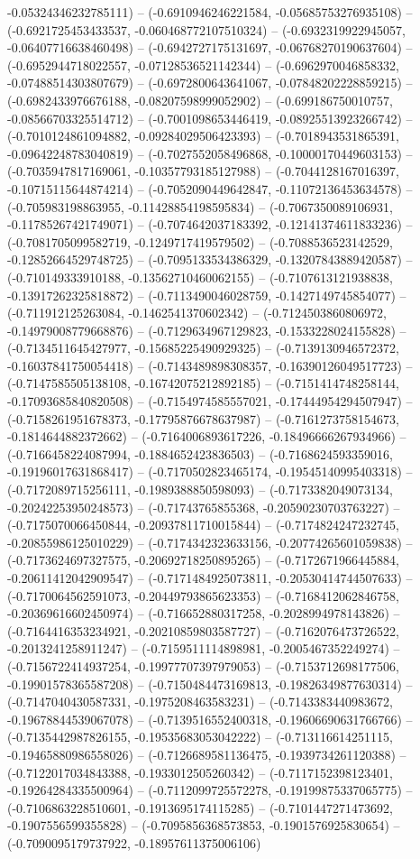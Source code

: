 -0.05324346232785111) -- (-0.6910946246221584, -0.05685753276935108) -- (-0.6921725453433537, -0.060468772107510324) -- (-0.6932319922945057, -0.06407716638460498) -- (-0.6942727175131697, -0.06768270190637604) -- (-0.6952944718022557, -0.07128536521142344) -- (-0.6962970046858332, -0.07488514303807679) -- (-0.6972800643641067, -0.07848202228859215) -- (-0.6982433976676188, -0.08207598999052902) -- (-0.699186750010757, -0.08566703325514712) -- (-0.7001098653446419, -0.08925513923266742) -- (-0.7010124861094882, -0.09284029506423393) -- (-0.7018943531865391, -0.09642248783040819) -- (-0.7027552058496868, -0.10000170449603153) -- (-0.7035947817169061, -0.10357793185127988) -- (-0.7044128167016397, -0.10715115644874214) -- (-0.7052090449642847, -0.11072136453634578) -- (-0.705983198863955, -0.11428854198595834) -- (-0.7067350089106931, -0.11785267421749071) -- (-0.7074642037183392, -0.12141374611833236) -- (-0.7081705099582719, -0.1249717419579502) -- (-0.7088536523142529, -0.12852664529748725) -- (-0.7095133534386329, -0.13207843889420587) -- (-0.710149333910188, -0.13562710460062155) -- (-0.7107613121938838, -0.13917262325818872) -- (-0.7113490046028759, -0.1427149745854077) -- (-0.711912125263084, -0.1462541370602342) -- (-0.7124503860806972, -0.14979008779668876) -- (-0.7129634967129823, -0.1533228024155828) -- (-0.7134511645427977, -0.15685225490929325) -- (-0.7139130946572372, -0.16037841750054418) -- (-0.7143489898308357, -0.16390126049517723) -- (-0.7147585505138108, -0.16742075212892185) -- (-0.7151414748258144, -0.17093685840820508) -- (-0.7154974585557021, -0.17444954294507947) -- (-0.7158261951678373, -0.17795876678637987) -- (-0.7161273758154673, -0.1814644882372662) -- (-0.7164006893617226, -0.18496666267934966) -- (-0.7166458224087994, -0.1884652423836503) -- (-0.7168624593359016, -0.19196017631868417) -- (-0.7170502823465174, -0.19545140995403318) -- (-0.7172089715256111, -0.1989388850598093) -- (-0.7173382049073134, -0.20242253950248573) -- (-0.71743765855368, -0.20590230703763227) -- (-0.7175070066450844, -0.20937811710015844) -- (-0.7174824247232745, -0.20855986125010229) -- (-0.7174342323633156, -0.20774265601059838) -- (-0.7173624697327575, -0.20692718250895265) -- (-0.7172671966445884, -0.20611412042909547) -- (-0.7171484925073811, -0.20530414744507633) -- (-0.7170064562591073, -0.20449793865623353) -- (-0.7168412062846758, -0.20369616602450974) -- (-0.716652880317258, -0.2028994978143826) -- (-0.7164416353234921, -0.20210859803587727) -- (-0.7162076473726522, -0.2013241258911247) -- (-0.7159511114898981, -0.2005467352249274) -- (-0.7156722414937254, -0.19977707397979053) -- (-0.7153712698177506, -0.19901578365587208) -- (-0.7150484473169813, -0.19826349877630314) -- (-0.7147040430587331, -0.1975208463583231) -- (-0.7143383440983672, -0.19678844539067078) -- (-0.7139516552400318, -0.19606690631766766) -- (-0.7135442987826155, -0.19535683053042222) -- (-0.713116614251115, -0.19465880986558026) -- (-0.7126689581136475, -0.1939734261120388) -- (-0.7122017034843388, -0.1933012505260342) -- (-0.7117152398123401, -0.19264284335500964) -- (-0.7112099725572278, -0.19199875337065775) -- (-0.7106863228510601, -0.1913695174115285) -- (-0.7101447271473692, -0.1907556599355828) -- (-0.7095856368573853, -0.1901576925830654) -- (-0.7090095179737922, -0.18957611375006106) 